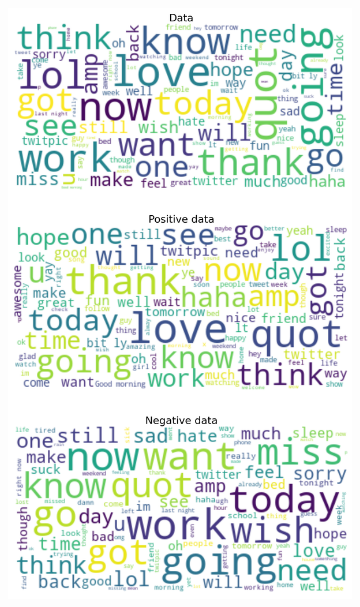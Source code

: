 \documentclass{article}
\begin{document}
\begin{itemize}
  \begin{figure}[H]
    \centering
    \captionsetup{justification=centering}
    \begin{subfigure}[b]{0.24\textwidth}
      \centering
      \includegraphics[width=\textwidth]{chapter-06/section-01-01/03/visualization/1/wordcloud.png}
    \end{subfigure}
    \begin{subfigure}[b]{0.24\textwidth}
      \centering

\end{subfigure}
\end{figure}
\end{itemize}
\end{document}
